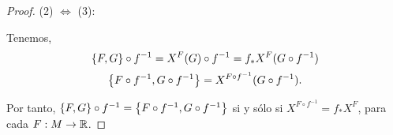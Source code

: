 \begin{proof}
  (2) $\Longleftrightarrow$ (3):

  Tenemos,
  \begin{equation*}
    \left\lbrace F,G\right\rbrace \circ f^{-1} = X^{F}(G) \circ f^{-1} = f_* X^F (G \circ f^{-1})
  \end{equation*}
  \begin{equation*}
    \left\lbrace F\circ f^{-1},G \circ f^{-1}\right\rbrace = X^{F\circ f^{-1}}(G \circ f^{-1}).
  \end{equation*}

  Por tanto, $\left\lbrace F,G\right\rbrace \circ f^{-1}=\left\lbrace F\circ f^{-1},G \circ f^{-1}\right\rbrace$ si y sólo si $X^{F \circ f^{-1}}= f_* X^{F}$, para cada $F: M \rightarrow \mathbb{R}$.
\end{proof}

